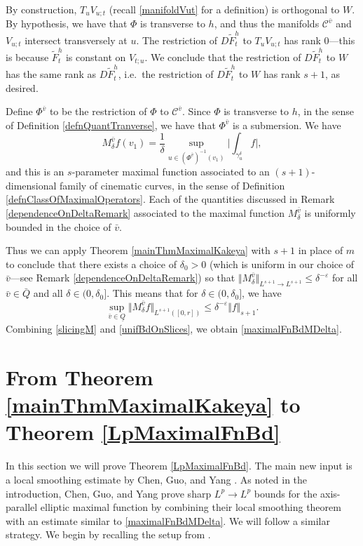 \documentclass[letterpaper, reqno,11pt]{article}
\numberwithin{equation}{section}
\newcommand{\eps}{\varepsilon}
\numberwithin{thm}{section}
\theoremstyle{remark}
\begin{document}
By construction, $T_u V_{u;t}$ (recall \eqref{manifoldVut} for a definition) is orthogonal to $W$. By hypothesis, we have that $\Phi$ is transverse to $h$, and thus the manifolds $\mathcal{C}^{\bar v}$ and $V_{u;t}$ intersect transversely at $u$. The restriction of $D\tilde F^{h}_t$ to $T_u V_{u;t}$ has rank 0---this is because $\tilde F^h_t$ is constant on $V_{t;u}$. We conclude that the restriction of $D\tilde F^{h}_t$ to $W$ has the same rank as $D\tilde F^h_t$, i.e.~the restriction of $D\tilde F^{h}_t$ to $W$ has rank $s+1$, as desired. 


Define $\Phi^{\bar v}$ to be the restriction of $\Phi$ to $\mathcal{C}^{\bar v}$. Since $\Phi$ is transverse to $h$, in the sense of Definition \ref{defnQuantTranverse}, we have that $\Phi^{\bar v}$ is a submersion. We have
\[
M^{\bar v}_\delta f(v_1)=\frac{1}{\delta}\sup_{u\in (\Phi^{\bar v})^{-1}(v_1)}\Big|\int_{\gamma_u^\delta} f\Big|,
\]
and this is an $s$-parameter maximal function associated to an $(s+1)$-dimensional family of cinematic curves, in the sense of Definition \ref{defnClassOfMaximalOperators}. Each of the quantities discussed in Remark \ref{dependenceOnDeltaRemark} associated to the maximal function $M^{\bar v}_\delta$ is uniformly bounded in the choice of $\bar v$. 

 Thus we can apply Theorem \ref{mainThmMaximalKakeya} with $s+1$ in place of $m$ to conclude that there exists a choice of $\delta_0>0$ (which is uniform in our choice of $\bar v$---see Remark \ref{dependenceOnDeltaRemark}) so that $\Vert M^{\bar v}_\delta\Vert_{L^{s+1}\to L^{s+1}}\leq\delta^{-\eps}$ for all $\bar v\in\bar Q$ and all $\delta\in (0,\delta_0]$. This means that for $\delta\in (0,\delta_0]$, we have
\begin{equation}\label{unifBdOnSlices}
\sup_{\bar v\in\underline Q}\big\Vert M^{\bar v}_\delta f\big\Vert_{L^{s+1}([0,r])}\leq\delta^{-\eps}\Vert f\Vert_{s+1}.
\end{equation}
Combining \eqref{slicingM} and \eqref{unifBdOnSlices}, we obtain \eqref{maximalFnBdMDelta}. 





\section{From Theorem \ref{mainThmMaximalKakeya} to Theorem \ref{LpMaximalFnBd} }\label{proofOfTheoremLpMaximalFnBdSec}
In this section we will prove Theorem \ref{LpMaximalFnBd}. The main new input is a local smoothing estimate by Chen, Guo, and Yang \cite{CGYv6}. As noted in the introduction, Chen, Guo, and Yang prove sharp $L^p\to L^p$ bounds for the axis-parallel elliptic maximal function by combining their local smoothing theorem with an estimate similar to \eqref{maximalFnBdMDelta}. We will follow a similar strategy. We begin by recalling the setup from \cite{CGYv2}.
\end{document}
